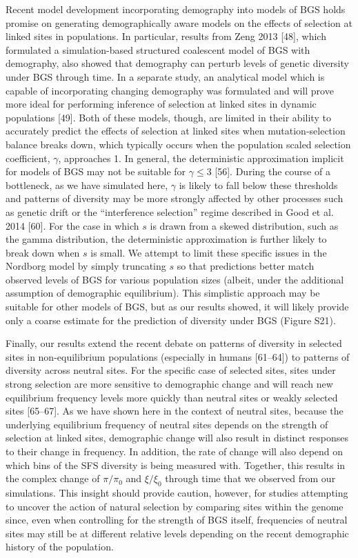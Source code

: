 \documentclass[9pt,twocolumn,twoside]{rilabRxiv}
\begin{document}
Recent model development incorporating demography into models of BGS
holds promise on generating demographically aware models on the effects
of selection at linked sites in populations. In particular, results from
Zeng 2013 [48], which formulated a simulation-based structured
coalescent model of BGS with demography, also showed that demography can
perturb levels of genetic diversity under BGS through time. In a
separate study, an analytical model which is capable of incorporating
changing demography was formulated and will prove more ideal for
performing inference of selection at linked sites in dynamic populations
[49]. Both of these models, though, are limited in their ability to
accurately predict the effects of selection at linked sites when
mutation-selection balance breaks down, which typically occurs when the
population scaled selection coefficient, $\gamma$, approaches 1. In
general, the deterministic approximation implicit for models of BGS may
not be suitable for $\gamma \leq 3$ [56]. During the course of a
bottleneck, as we have simulated here, $\gamma$ is likely to fall below
these thresholds and patterns of diversity may be more strongly affected
by other processes such as genetic drift or the ``interference
selection'' regime described in Good et al. 2014 [60]. For the case
in which $s$ is drawn from a skewed distribution, such as the gamma
distribution, the deterministic approximation is further likely to break
down when $s$ is small. We attempt to limit these specific issues
in the Nordborg model by simply truncating $s$ so that predictions
better match observed levels of BGS for various population sizes
(albeit, under the additional assumption of demographic equilibrium).
This simplistic approach may be suitable for other models of BGS, but as
our results showed, it will likely provide only a coarse estimate for
the prediction of diversity under BGS (Figure S21).

Finally, our results extend the recent
debate on patterns of diversity in selected sites in non-equilibrium
populations (especially in humans [61--64]) to patterns of diversity
across neutral sites. For the specific case of selected sites, sites
under strong selection are more sensitive to demographic change and will
reach new equilibrium frequency levels more quickly than neutral sites
or weakly selected sites [65--67]. As we have shown here in the
context of neutral sites, because the underlying equilibrium frequency
of neutral sites depends on the strength of selection at linked sites,
demographic change will also result in distinct responses to their
change in frequency. In addition, the rate of change will also depend on
which bins of the SFS diversity is being measured with. Together, this
results in the complex change of $\pi/\pi_0$ and
$\xi/\xi_0$ through time that we observed from our simulations.
This insight should provide caution, however, for studies attempting to
uncover the action of natural selection by comparing sites within the
genome since, even when controlling for the strength of BGS itself,
frequencies of neutral sites may still be at different relative levels
depending on the recent demographic history of the population.
\end{document}
